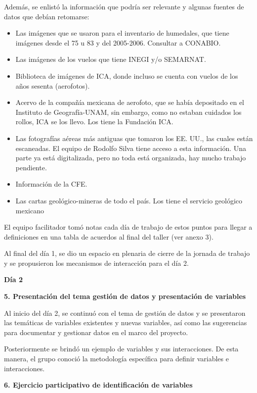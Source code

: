\documentclass[
  letterpaper,
  DIV=11,
  numbers=noendperiod]{scrreprt}
\begin{document}
Además, se enlistó la información que podría ser relevante y algunas
fuentes de datos que debían retomarse:

\begin{itemize}
\item
  Las imágenes que se usaron para el inventario de humedales, que tiene
  imágenes desde el 75 u 83 y del 2005-2006. Consultar a CONABIO.
\item
  Las imágenes de los vuelos que tiene INEGI y/o SEMARNAT.
\item
  Biblioteca de imágenes de ICA, donde incluso se cuenta con vuelos de
  los años sesenta (aerofotos).
\item
  Acervo de la compañía mexicana de aerofoto, que se había depositado en
  el Instituto de Geografía-UNAM, sin embargo, como no estaban cuidados
  los rollos, ICA se los llevo. Los tiene la Fundación ICA.
\item
  Las fotografías aéreas más antiguas que tomaron los EE. UU., las
  cuales están escaneadas. El equipo de Rodolfo Silva tiene acceso a
  esta información. Una parte ya está digitalizada, pero no toda está
  organizada, hay mucho trabajo pendiente.
\item
  Información de la CFE.
\item
  Las cartas geológico-mineras de todo el país. Los tiene el servicio
  geológico mexicano
\end{itemize}

El equipo facilitador tomó notas cada día de trabajo de estos puntos
para llegar a definiciones en una tabla de acuerdos al final del taller
(ver anexo 3).

Al final del día 1, se dio un espacio en plenaria de cierre de la
jornada de trabajo y se propusieron los mecanismos de interacción para
el día 2.

\textbf{Día 2}

\textbf{5. Presentación del tema gestión de datos y presentación de
variables}

Al inicio del día 2, se continuó con el tema de gestión de datos y se
presentaron las temáticas de variables existentes y nuevas variables,
así como las sugerencias para documentar y gestionar datos en el marco
del proyecto.

Posteriormente se brindó un ejemplo de variables y sus interacciones. De
esta manera, el grupo conoció la metodología específica para definir
variables e interacciones.

\textbf{6. Ejercicio participativo de identificación de variables}
\end{document}
